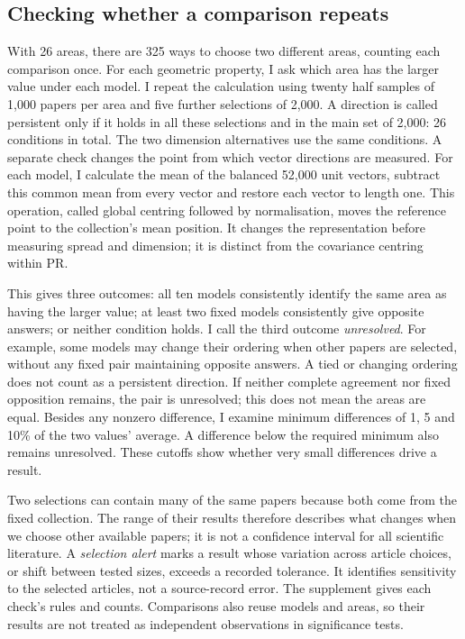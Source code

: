 \documentclass[12pt]{article}
\begin{document}
\subsection{Checking whether a comparison repeats}
With 26 areas, there are 325 ways to choose two different areas, counting each comparison once. For each geometric property, I ask which area has the larger value under each model. I repeat the calculation using twenty half samples of 1,000 papers per area and five further selections of 2,000. A direction is called persistent only if it holds in all these selections and in the main set of 2,000: 26 conditions in total. The two dimension alternatives use the same conditions. A separate check changes the point from which vector directions are measured. For each model, I calculate the mean of the balanced 52,000 unit vectors, subtract this common mean from every vector and restore each vector to length one. This operation, called global centring followed by normalisation, moves the reference point to the collection's mean position. It changes the representation before measuring spread and dimension; it is distinct from the covariance centring within PR.

This gives three outcomes: all ten models consistently identify the same area as having the larger value; at least two fixed models consistently give opposite answers; or neither condition holds. I call the third outcome \emph{unresolved}. For example, some models may change their ordering when other papers are selected, without any fixed pair maintaining opposite answers. A tied or changing ordering does not count as a persistent direction. If neither complete agreement nor fixed opposition remains, the pair is unresolved; this does not mean the areas are equal. Besides any nonzero difference, I examine minimum differences of 1, 5 and 10\% of the two values' average. A difference below the required minimum also remains unresolved. These cutoffs show whether very small differences drive a result.

Two selections can contain many of the same papers because both come from the fixed collection. The range of their results therefore describes what changes when we choose other available papers; it is not a confidence interval for all scientific literature. A \emph{selection alert} marks a result whose variation across article choices, or shift between tested sizes, exceeds a recorded tolerance. It identifies sensitivity to the selected articles, not a source-record error. The supplement gives each check's rules and counts. Comparisons also reuse models and areas, so their results are not treated as independent observations in significance tests.
\end{document}
